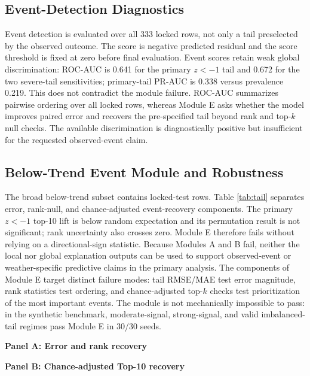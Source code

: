 \documentclass[conference]{IEEEtran}
\renewcommand{\arraystretch}{0.98}
\begin{document}
\subsection{Event-Detection Diagnostics}
Event detection is evaluated over all 333 locked rows, not only a tail preselected
by the observed outcome. The score is negative predicted residual and the score
threshold is fixed at zero before final evaluation. Event scores retain weak
global discrimination: ROC-AUC is 0.641 for the primary $z<-1$ tail and 0.672 for
the two severe-tail sensitivities; primary-tail PR-AUC is 0.338 versus prevalence
0.219. This does not contradict the module failure. ROC-AUC summarizes pairwise
ordering over all locked rows, whereas Module E asks whether the model improves
paired error and recovers the pre-specified tail beyond rank and top-$k$ null
checks. The available discrimination is diagnostically positive but insufficient
for the requested observed-event claim.

\subsection{Below-Trend Event Module and Robustness}
The broad below-trend subset contains \AuditTailRows{} locked-test rows. Table
\ref{tab:tail} separates error, rank-null, and chance-adjusted event-recovery
components. The primary $z<-1$ top-10 lift is below random expectation and its
permutation result is not significant; rank uncertainty also crosses zero. Module E
therefore fails without relying on a directional-sign statistic. Because Modules A
and B fail, neither the local nor global explanation outputs can be used to
support observed-event or weather-specific predictive claims in the primary
analysis.
The components of Module E target distinct failure modes: tail RMSE/MAE test
error magnitude, rank statistics test ordering, and chance-adjusted top-$k$
checks test prioritization of the most important events. The module is not
mechanically impossible to pass: in the synthetic benchmark, moderate-signal,
strong-signal, and valid imbalanced-tail regimes pass Module E in 30/30 seeds.

\begin{table}[t]
\centering
\caption{Tail components on train-only targets. Panel A reports error and rank
recovery; Panel B reports chance-adjusted Top-10 recovery. $H$ is the
hypergeometric probability and $P$ is the within-year permutation probability.
The Top-10 component passes only when lift $>1$, the lower lift CI $>1$, and both
$H$ and $P$ are $<.05$. Only $z<-1$ is primary; $z<-1.5$ passes error but fails
rank and top-k, while $z<-2$ fails the complete event module.}
\label{tab:tail}
\footnotesize
\renewcommand{\arraystretch}{1.08}
\textbf{Panel A: Error and rank recovery}\par\smallskip

\par\medskip
\textbf{Panel B: Chance-adjusted Top-10 recovery}\par\smallskip

\end{table}
\end{document}
